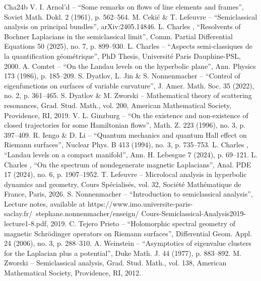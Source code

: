 \begin{thebibliography}{Cha24b}
 V. I. Arnol’d – “Some remarks on flows of line elements and frames”, Soviet Math. Dokl. 2 (1961), p. 562–564.
 M. Cekić \& T. Lefeuvre – “Semiclassical analysis on principal bundles”, arXiv:2405.14846.
 L. Charles , “Resolvents of Bochner Laplacians in the semiclassical limit”, Comm. Partial Differential Equations 50 (2025), no. 7, p. 899–930.
 L. Charles – “Aspects semi-classiques de la quantification géométrique”, PhD Thesis, Université Paris Dauphine-PSL, 2000.
 A. Comtet – “On the Landau levels on the hyperbolic plane”, Ann. Physics 173 (1986), p. 185–209.
 S. Dyatlov, L. Jin \& S. Nonnenmacher – “Control of eigenfunctions on surfaces of variable curvature”, J. Amer. Math. Soc. 35 (2022), no. 2, p. 361–465.
 S. Dyatlov \& M. Zworski – Mathematical theory of scattering resonances, Grad. Stud. Math., vol. 200, American Mathematical Society, Providence, RI, 2019.
 V. L. Ginzburg – “On the existence and non-existence of closed trajectories for some Hamiltonian flows”, Math. Z. 223 (1996), no. 3, p. 397–409.
 R. Iengo \& D. Li – “Quantum mechanics and quantum Hall effect on Riemann surfaces”, Nuclear Phys. B 413 (1994), no. 3, p. 735–753.
 L. Charles , “Landau levels on a compact manifold”, Ann. H. Lebesgue 7 (2024), p. 69–121.
 L. Charles , “On the spectrum of nondegenerate magnetic Laplacians”, Anal. PDE 17 (2024), no. 6, p. 1907–1952.
 T. Lefeuvre – Microlocal analysis in hyperbolic dynamics and geometry, Cours Spécialisés, vol. 32, Société Mathématique de France, Paris, 2026.
 S. Nonnenmacher – “Introduction to semiclassical analysis”, Lecture notes, available at https://www.imo.universite-paris-saclay.fr/~stephane.nonnenmacher/enseign/ Cours-Semiclassical-Analysis2019-lecture1-8.pdf, 2019.
 C. Tejero Prieto – “Holomorphic spectral geometry of magnetic Schrödinger operators on Riemann surfaces”, Differential Geom. Appl. 24 (2006), no. 3, p. 288–310.
 A. Weinstein – “Asymptotics of eigenvalue clusters for the Laplacian plus a potential”, Duke Math. J. 44 (1977), p. 883–892.
 M. Zworski – Semiclassical analysis, Grad. Stud. Math., vol. 138, American Mathematical Society, Providence, RI, 2012.

\end{thebibliography}
